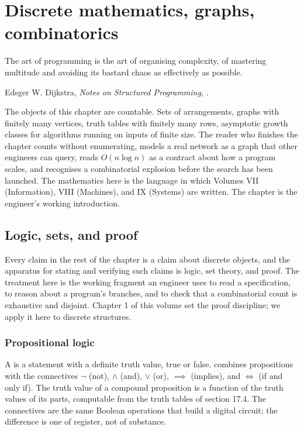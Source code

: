 \chapter{Discrete mathematics, graphs, combinatorics}
\label{vol02:ch17}

\epigraph{The art of programming is the art of organising
complexity, of mastering multitude and avoiding its bastard
chaos as effectively as possible.}{Edsger W. Dijkstra,
\emph{Notes on Structured Programming},
\cite[p.~6]{gen:dijkstra1972}.}


\noindent
The objects of this chapter are countable. Sets of arrangements,
graphs with finitely many vertices, truth tables with finitely
many rows, asymptotic growth classes for algorithms running on
inputs of finite size. The reader who finishes the chapter counts
without enumerating, models a real network as a graph that other
engineers can query, reads $O(n \log n)$ as a contract about how a
program scales, and recognises a combinatorial explosion before the
search has been launched. The mathematics here is the language in
which Volumes VII (Information), VIII (Machines), and IX (Systems)
are written. The chapter is the engineer's working introduction.

\section{Logic, sets, and proof}

Every claim in the rest of the chapter is a claim about discrete
objects, and the apparatus for stating and verifying such claims is
logic, set theory, and proof. The treatment here is the working
fragment an engineer uses to read a specification, to reason about
a program's branches, and to check that a combinatorial count is
exhaustive and disjoint. Chapter 1 of this volume set the proof
discipline; we apply it here to discrete structures.

\subsection{Propositional logic}

A  is a statement with a definite truth value,
true or false.  combines propositions
with the connectives $\lnot$ (not), $\land$ (and), $\lor$ (or),
$\implies$ (implies), and $\iff$ (if and only if). The truth value
of a compound proposition is a function of the truth values of its
parts, computable from the truth tables of section 17.4. The
connectives are the same Boolean operations that build a digital
circuit; the difference is one of register, not of substance.


